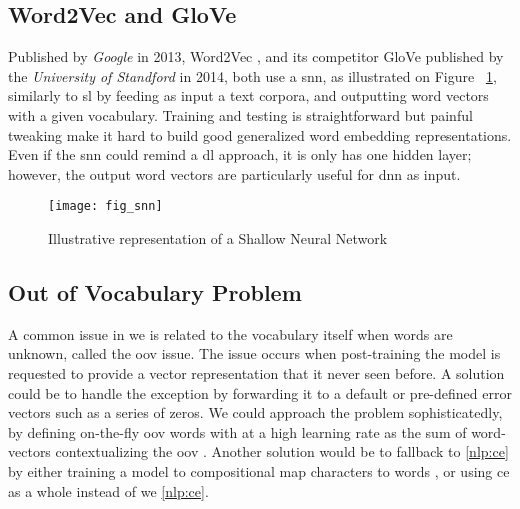 \subsection{Word2Vec and GloVe}
\label{nlp:word2vec}
Published by \textit{Google} in 2013, Word2Vec \autocite{paper:word2vec}, and its competitor GloVe \autocite{paper:glove} published by the \textit{University of Standford} in 2014, both use a \gls{snn}, as illustrated on Figure ~\ref{fig:fig_snn}, similarly to \gls{sl} by feeding as input a text corpora, and outputting word vectors with a given vocabulary. Training and testing is straightforward but painful tweaking make it hard to build good generalized word embedding representations. Even if the \gls{snn} could remind a \gls{dl} approach, it is only has one hidden layer; however, the output word vectors are particularly useful for \gls{dnn} as input.

\begin{figure}
    \centering
    \texttt{[image: fig\_snn]}
    \caption{Illustrative representation of a Shallow Neural Network}
    \label{fig:fig_snn}
\end{figure}

\subsection{Out of Vocabulary Problem}
\label{nlp:oov}
A common issue in \gls{we} is related to the vocabulary itself when words are unknown, called the \gls{oov} issue. The issue occurs when post-training the model is requested to provide a vector representation that it never seen before. A solution could be to handle the exception by forwarding it to a default or pre-defined error vectors such as a series of zeros. We could approach the problem sophisticatedly, by defining on-the-fly \gls{oov} words with at a high learning rate as the sum of word-vectors contextualizing the \gls{oov}  \autocite{paper:journals/corr/HerbelotB17}. Another solution would be to fallback to \ref{nlp:ce} by either training a model to compositional map characters to words \autocite{paper:journals/corr/PinterGE17}, or using \gls{ce} as a whole instead of \gls{we} \ref{nlp:ce}.

